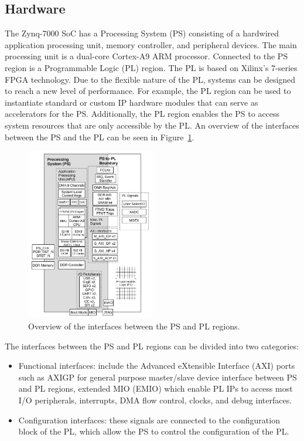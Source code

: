 \subsection{Hardware}
The Zynq-7000 SoC has a Processing System (PS) consisting of a hardwired application processing unit, memory controller, and peripheral devices. The main processing unit is a dual-core Cortex-A9 ARM processor. Connected to the PS region is a Programmable Logic (PL) region. The PL is based on Xilinx’s 7-series FPGA technology. 
Due to the flexible nature of the PL, systems can be designed to reach a new level of performance. For example, the PL region can be used to instantiate standard or custom IP hardware modules that can serve as accelerators for the PS. Additionally, the PL region enables the PS to access system resources that are only accessible by the PL. %
An overview of the interfaces between the PS and the PL can be seen in Figure~\ref{fig:interface}.\\ 

\begin{figure}[H]
\centering
\includegraphics[width=0.5\textwidth]{./img/literature_interface.png}
\caption{Overview of the interfaces between the PS and PL regions.\cite{zaki2016}}\label{fig:interface}
\end{figure}

The interfaces between the PS and PL regions can be divided into two categories: 
\begin{itemize}
\item Functional interfaces: include the Advanced eXtensible Interface (AXI) ports such as AXIGP for general purpose master/slave device interface between PS and PL regions, extended MIO (EMIO) which enable PL IPs to access most I/O peripherals, interrupts, DMA flow control, clocks, and debug interfaces.
\item Configuration interfaces: these signals are connected to the configuration block of the PL, which allow the PS to control the configuration of the PL. %
\end{itemize}

